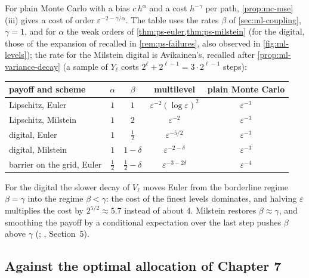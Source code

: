 For plain Monte Carlo with a bias $c\,h^\alpha$ and a cost $h^{-\gamma}$ per path,
\cref{prop:mc-mse}(iii) gives a cost of order $\varepsilon^{-2-\gamma/\alpha}$. The table uses the
rates $\beta$ of \cref{sec:ml-coupling}, $\gamma=1$, and for $\alpha$ the weak orders of
\cref{thm:ps-euler,thm:ps-milstein} (for the digital, those of the expansion of \citealp{bally-talay}
recalled in \cref{rem:ps-failures}, also observed in \cref{fig:ml-levels}); the rate for the
Milstein digital is Avikainen's, recalled after \cref{prop:ml-variance-decay} (a sample of $Y_\ell$ costs $2^\ell+2^{\ell-1}=3\cdot2^{\ell-1}$
steps):
\begin{center}
\begin{tabular}{lcccc}
\toprule
payoff and scheme & $\alpha$ & $\beta$ & multilevel & plain Monte Carlo\\
\midrule
Lipschitz, Euler & $1$ & $1$ & $\varepsilon^{-2}(\log\varepsilon)^2$ & $\varepsilon^{-3}$\\
Lipschitz, Milstein & $1$ & $2$ & $\varepsilon^{-2}$ & $\varepsilon^{-3}$\\
digital, Euler & $1$ & $\frac12$ & $\varepsilon^{-5/2}$ & $\varepsilon^{-3}$\\
digital, Milstein & $1$ & $1-\delta$ & $\varepsilon^{-2-\delta}$ & $\varepsilon^{-3}$\\
barrier on the grid, Euler & $\frac12$ & $\frac12-\delta$ & $\varepsilon^{-3-2\delta}$ & $\varepsilon^{-4}$\\
\bottomrule
\end{tabular}
\end{center}
For the digital the slower decay of $V_\ell$ moves Euler from the borderline regime $\beta=\gamma$
into the regime $\beta<\gamma$: the cost of the finest levels dominates, and halving $\varepsilon$
multiplies the cost by $2^{5/2}\approx5.7$ instead of about $4$. Milstein restores $\beta\approx\gamma$,
and smoothing the payoff by a conditional expectation over the last step pushes $\beta$ above
$\gamma$ (; \citealp{giles-acta}, Section~5).

\subsection*{Against the optimal allocation of Chapter 7}

